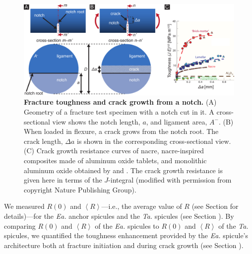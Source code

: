 \documentclass[12pt,onecolumn]{article}
\makeatletter
\DeclareRobustCommand*{\nameref}[1]{%
      \emph{\myorg@nameref{#1}}%
    }%
\newcommand{\TA}{\textit{Ta.\@}\xspace}
\newcommand{\EA}{\textit{Ea.\@}\xspace}
\makeatother
\begin{document}
			\begin{figure}[ht!]
			\centering
			\includegraphics[width=\textwidth]{../Figures/FigureRcurve/Figure3a_V7.pdf}
			\caption{\textbf{Fracture toughness and crack growth from a notch.} (A) Geometry of a fracture test specimen with a notch cut in it. A cross-sectional view shows the notch length, $a$, and ligament area, $A^-$. (B) When loaded in flexure, a crack grows from the notch root. The crack length, $\Delta a$ is shown in the corresponding cross-sectional view. (C) Crack growth resistance curves of nacre, nacre-inspired composites made of aluminum oxide tablets, and monolithic aluminum oxide obtained by \cite{ritchie2011conflicts} and \cite{munch2008tough}. The crack growth resistance is given here in terms of the $J$-integral (modified with permission from \cite{ritchie2011conflicts} copyright Nature Publishing Group).}
			\label{fig:Rcurve}
			\end{figure}

We measured $R(0)$ and $\left< R \right>$---i.e., the average value of $R$ (see Section \nameref{sec:avgR} for details)---for the \EA anchor spicules and the \TA spicules (see Section \nameref{sec:res}). By comparing $R(0)$ and $\left< R \right>$ of the \EA spicules to $R(0)$ and $\left< R \right>$ of the \TA spicules, we quantified the toughness enhancement provided by the \EA spicule's architecture both at fracture initiation and during crack growth (see Section \nameref{sec:Rcomp}).

\end{document}
